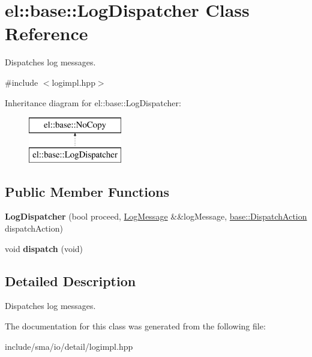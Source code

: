 \hypertarget{classel_1_1base_1_1LogDispatcher}{\section{el\-:\-:base\-:\-:Log\-Dispatcher Class Reference}
\label{classel_1_1base_1_1LogDispatcher}
}


Dispatches log messages.  




{\ttfamily \#include $<$logimpl.\-hpp$>$}

Inheritance diagram for el\-:\-:base\-:\-:Log\-Dispatcher\-:\begin{figure}[H]
\begin{center}
\leavevmode
\includegraphics[height=2.000000cm]{classel_1_1base_1_1LogDispatcher}
\end{center}
\end{figure}
\subsection*{Public Member Functions}
\begin{DoxyCompactItemize}
\item 
\hypertarget{classel_1_1base_1_1LogDispatcher_aef59d9895c348f0b3ad5a776276f1c22}{{\bfseries Log\-Dispatcher} (bool proceed, \hyperlink{classel_1_1LogMessage}{Log\-Message} \&\&log\-Message, \hyperlink{namespaceel_1_1base_a3aa2563d38e47388ba242a1694fc2839}{base\-::\-Dispatch\-Action} dispatch\-Action)}\label{classel_1_1base_1_1LogDispatcher_aef59d9895c348f0b3ad5a776276f1c22}

\item 
\hypertarget{classel_1_1base_1_1LogDispatcher_a88d4a644364bb454136c85338f05da7a}{void {\bfseries dispatch} (void)}\label{classel_1_1base_1_1LogDispatcher_a88d4a644364bb454136c85338f05da7a}

\end{DoxyCompactItemize}


\subsection{Detailed Description}
Dispatches log messages. 

The documentation for this class was generated from the following file\-:\begin{DoxyCompactItemize}
\item 
include/sma/io/detail/logimpl.\-hpp\end{DoxyCompactItemize}
